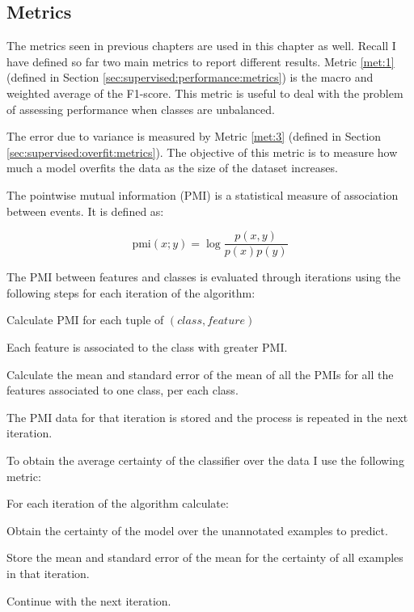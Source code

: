 \subsection{Metrics}\label{sec:self-learning:metrics}

The metrics seen in previous chapters are used in this chapter as well. Recall
I have defined so far two main metrics to report different results. Metric
\ref{met:1} (defined in Section \ref{sec:supervised:performance:metrics}) is
the macro and weighted average of the F1-score. This metric is useful to deal
with the problem of assessing performance when classes are unbalanced.

The error due to variance is measured by Metric \ref{met:3} (defined in Section
\ref{sec:supervised:overfit:metrics}). The objective of this metric is to
measure how much a model overfits the data as the size of the dataset
increases.

The pointwise mutual information (PMI) is a statistical measure of association
between events. It is defined as:

\[
  \text{pmi}(x; y) = \log\frac{p(x, y)}{p(x)p(y)}
\]

\begin{metric}\label{met:4}
  The PMI between features and classes is evaluated through iterations using
  the following steps for each iteration of the algorithm:
  \begin{enummet}
    \item Calculate PMI for each tuple of $(class, feature)$
    \item Each feature is associated to the class with greater PMI.
    \item Calculate the mean and standard error of the mean of all the PMIs for
      all the features associated to one class, per each class.
    \item The PMI data for that iteration is stored and the process is repeated
      in the next iteration.
  \end{enummet}
\end{metric}

To obtain the average certainty of the classifier over the data I use the
following metric:

\begin{metric}\label{met:5}
  For each iteration of the algorithm calculate:
  \begin{enummet}
    \item Obtain the certainty of the model over the unannotated examples to
      predict.
    \item Store the mean and standard error of the mean for the certainty of
      all examples in that iteration.
    \item Continue with the next iteration.
  \end{enummet}
\end{metric}

